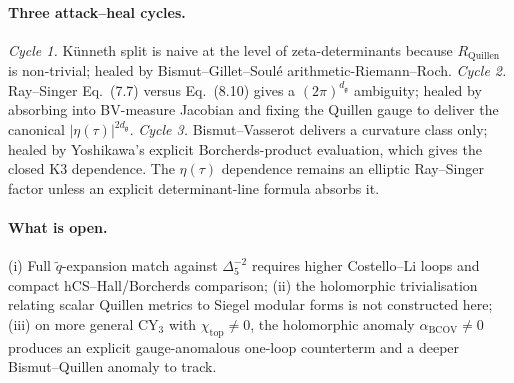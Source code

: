 \documentclass[11pt]{article}
\theoremstyle{definition}
\providecommand{\frakg}{\mathfrak{g}}
\providecommand{\BCOV}{\mathrm{BCOV}}
\begin{document}
\paragraph{Three attack--heal cycles.}
\textit{Cycle 1.} K\"unneth split is naive at the level of
zeta-determinants because $R_{\mathrm{Quillen}}$ is non-trivial; healed
by Bismut--Gillet--Soul\'e arithmetic-Riemann--Roch.
\textit{Cycle 2.} Ray--Singer Eq.~(7.7) versus Eq.~(8.10) gives a
$(2\pi)^{d_\frakg}$ ambiguity; healed by absorbing into BV-measure
Jacobian and fixing the Quillen gauge to deliver the canonical
$|\eta(\tau)|^{2d_\frakg}$.
\textit{Cycle 3.} Bismut--Vasserot delivers a curvature class only;
healed by Yoshikawa's explicit Borcherds-product evaluation, which
gives the closed K3 dependence. The $\eta(\tau)$ dependence remains an
elliptic Ray--Singer factor unless an explicit determinant-line formula
absorbs it.

\paragraph{What is open.} (i) Full $\tilde q$-expansion match against
$\Delta_5^{-2}$ requires higher Costello--Li loops and compact
hCS--Hall/Borcherds comparison; (ii) the holomorphic trivialisation
relating scalar Quillen metrics to Siegel modular forms is not
constructed here; (iii) on more general CY$_3$ with
$\chi_{\mathrm{top}} \neq 0$, the holomorphic anomaly
$\alpha_{\BCOV} \neq 0$ produces an explicit gauge-anomalous one-loop
counterterm and a deeper Bismut--Quillen anomaly to track.
\end{document}
